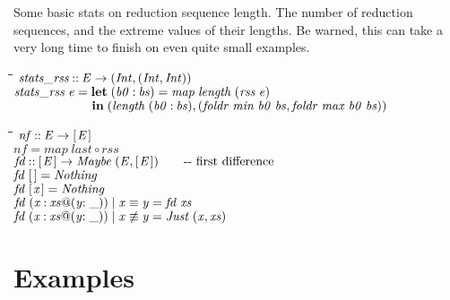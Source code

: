 \documentclass{article}
\newlength{\lwidth}\setlength{\lwidth}{4.5cm}
\newlength{\cwidth}\setlength{\cwidth}{8mm} %
\newcommand{\Conid}[1]{\mathit{#1}}
\newcommand{\Varid}[1]{\mathit{#1}}
\begin{document}
Some basic stats on reduction sequence length. The number
of reduction sequences, and the extreme values of their lengths.
Be warned, this can take a very long time to finish on
even quite small examples. 
\begin{tabbing}
\qquad\=\hspace{\lwidth}\=\hspace{\cwidth}\=\+\kill
${\Varid{stats\char95 rss}\mathbin{::}\Conid{E}\to (\Conid{Int},(\Conid{Int},\Conid{Int}))}$\\
${\Varid{stats\char95 rss}\;\Varid{e}\mathrel{=}\mathbf{let}\;(\Varid{b0}\mathbin{:}\Varid{bs})\mathrel{=}\Varid{map}\;\Varid{length}\;(\Varid{rss}\;\Varid{e})}$\\
${\phantom{\Varid{stats\char95 rss}\;\Varid{e}\mathrel{=}\mbox{}}\mathbf{in}\;(\Varid{length}\;(\Varid{b0}\mathbin{:}\Varid{bs}),(\Varid{foldr}\;\Varid{min}\;\Varid{b0}\;\Varid{bs},\Varid{foldr}\;\Varid{max}\;\Varid{b0}\;\Varid{bs}))}$
\end{tabbing}
\begin{tabbing}
\qquad\=\hspace{\lwidth}\=\hspace{\cwidth}\=\+\kill
${\Varid{nf}\mathbin{::}\Conid{E}\to [\mskip1.5mu \Conid{E}\mskip1.5mu]}$\\
${\Varid{nf}\mathrel{=}\Varid{map}\;\Varid{last}\mathbin{\circ}\Varid{rss}}$\\
${}$\\
${\Varid{fd}\mathbin{::}[\mskip1.5mu \Conid{E}\mskip1.5mu]\to \Conid{Maybe}\;(\Conid{E},[\mskip1.5mu \Conid{E}\mskip1.5mu])\mbox{\qquad-{}-  first difference}}$\\
${\Varid{fd}\;[\mskip1.5mu \mskip1.5mu]\mathrel{=}\Conid{Nothing}}$\\
${\Varid{fd}\;[\mskip1.5mu \Varid{x}\mskip1.5mu]\mathrel{=}\Conid{Nothing}}$\\
${\Varid{fd}\;(\Varid{x}\mathbin{:}\Varid{xs}\mathord{@}(\Varid{y}\mathbin{:\char95 }))\mid \Varid{x}\equiv \Varid{y}\mathrel{=}\Varid{fd}\;\Varid{xs}}$\\
${\Varid{fd}\;(\Varid{x}\mathbin{:}\Varid{xs}\mathord{@}(\Varid{y}\mathbin{:\char95 }))\mid \Varid{x}\not\equiv \Varid{y}\mathrel{=}\Conid{Just}\;(\Varid{x},\Varid{xs})}$
\end{tabbing}




\section{Examples} 
\end{document}
